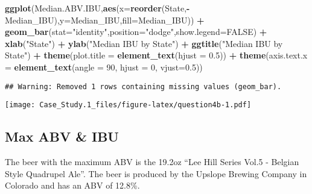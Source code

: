 \documentclass[]{article}
\newenvironment{Shaded}{\begin{snugshade}}{\end{snugshade}}
\newcommand{\DataTypeTok}[1]{\textcolor[rgb]{0.13,0.29,0.53}{#1}}
\newcommand{\DecValTok}[1]{\textcolor[rgb]{0.00,0.00,0.81}{#1}}
\newcommand{\FloatTok}[1]{\textcolor[rgb]{0.00,0.00,0.81}{#1}}
\newcommand{\KeywordTok}[1]{\textcolor[rgb]{0.13,0.29,0.53}{\textbf{#1}}}
\newcommand{\NormalTok}[1]{#1}
\newcommand{\OperatorTok}[1]{\textcolor[rgb]{0.81,0.36,0.00}{\textbf{#1}}}
\newcommand{\OtherTok}[1]{\textcolor[rgb]{0.56,0.35,0.01}{#1}}
\newcommand{\StringTok}[1]{\textcolor[rgb]{0.31,0.60,0.02}{#1}}
\begin{document}
\begin{Shaded}
\begin{Highlighting}[]
\KeywordTok{ggplot}\NormalTok{(Median.ABV.IBU,}\KeywordTok{aes}\NormalTok{(}\DataTypeTok{x=}\KeywordTok{reorder}\NormalTok{(State,}\OperatorTok{-}\NormalTok{Median_IBU),}\DataTypeTok{y=}\NormalTok{Median_IBU,}\DataTypeTok{fill=}\NormalTok{Median_IBU)) }\OperatorTok{+}
\StringTok{  }\KeywordTok{geom_bar}\NormalTok{(}\DataTypeTok{stat=}\StringTok{"identity"}\NormalTok{,}\DataTypeTok{position=}\StringTok{"dodge"}\NormalTok{,}\DataTypeTok{show.legend=}\OtherTok{FALSE}\NormalTok{) }\OperatorTok{+}
\StringTok{  }\KeywordTok{xlab}\NormalTok{(}\StringTok{"State"}\NormalTok{) }\OperatorTok{+}\StringTok{ }\KeywordTok{ylab}\NormalTok{(}\StringTok{"Median IBU by State"}\NormalTok{) }\OperatorTok{+}
\StringTok{  }\KeywordTok{ggtitle}\NormalTok{(}\StringTok{"Median IBU by State"}\NormalTok{) }\OperatorTok{+}
\StringTok{  }\KeywordTok{theme}\NormalTok{(}\DataTypeTok{plot.title =} \KeywordTok{element_text}\NormalTok{(}\DataTypeTok{hjust =} \FloatTok{0.5}\NormalTok{)) }\OperatorTok{+}
\StringTok{  }\KeywordTok{theme}\NormalTok{(}\DataTypeTok{axis.text.x =} \KeywordTok{element_text}\NormalTok{(}\DataTypeTok{angle =} \DecValTok{90}\NormalTok{, }\DataTypeTok{hjust =} \DecValTok{0}\NormalTok{, }\DataTypeTok{vjust=}\FloatTok{0.5}\NormalTok{))}
\end{Highlighting}
\end{Shaded}

\begin{verbatim}
## Warning: Removed 1 rows containing missing values (geom_bar).
\end{verbatim}

\texttt{[image: Case\_Study.1\_files/figure-latex/question4b-1.pdf]}

\hypertarget{max-abv-ibu}{%
\subsection{Max ABV \& IBU}\label{max-abv-ibu}}

The beer with the maximum ABV is the 19.2oz ``Lee Hill Series Vol.5 -
Belgian Style Quadrupel Ale''. The beer is produced by the Upslope
Brewing Company in Colorado and has an ABV of 12.8\%.

\begin{Shaded}
\end{Shaded}
\end{document}
